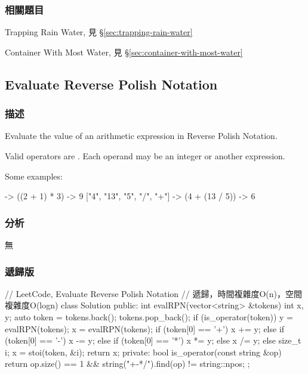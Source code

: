 \subsubsection{相關題目}
\begindot
\item Trapping Rain Water, 見 \S \ref{sec:trapping-rain-water}
\item Container With Most Water, 見 \S \ref{sec:container-with-most-water}
\myenddot


\subsection{Evaluate Reverse Polish Notation} %
\label{sec:evaluate-reverse-polish-notation}


\subsubsection{描述}
Evaluate the value of an arithmetic expression in Reverse Polish Notation.

Valid operators are \fn{+, -, *, /}. Each operand may be an integer or another expression.

Some examples:
\begin{Code}
  ["2", "1", "+", "3", "*"] -> ((2 + 1) * 3) -> 9
  ["4", "13", "5", "/", "+"] -> (4 + (13 / 5)) -> 6
\end{Code}


\subsubsection{分析}
無


\subsubsection{遞歸版}
\begin{Code}
// LeetCode, Evaluate Reverse Polish Notation
// 遞歸，時間複雜度O(n)，空間複雜度O(logn)
class Solution {
public:
    int evalRPN(vector<string> &tokens) {
        int x, y;
        auto token = tokens.back();  tokens.pop_back();
        if (is_operator(token))  {
            y = evalRPN(tokens);
            x = evalRPN(tokens);
            if (token[0] == '+')       x += y;
            else if (token[0] == '-')  x -= y;
            else if (token[0] == '*')  x *= y;
            else                       x /= y;
        } else  {
            size_t i;
            x = stoi(token, &i);
        }
        return x;
    }
private:
    bool is_operator(const string &op) {
        return op.size() == 1 && string("+-*/").find(op) != string::npos;
    }
};
\end{Code}


